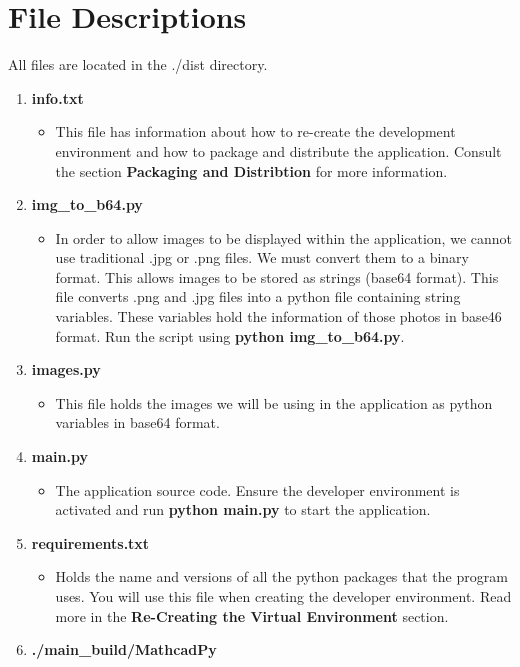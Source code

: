 \documentclass[11pt]{article}
\begin{document}
\section{File Descriptions}
\label{sec:org3997b83}
All files are located in the ./dist directory. 
\begin{enumerate}
\item \textbf{info.txt}
\begin{itemize}
\item This file has information about how to re-create the development environment and how to package and distribute the application. Consult the section \textbf{Packaging and Distribtion} for more information.
\end{itemize}
\item \textbf{img\_to\_b64.py}
\begin{itemize}
\item In order to allow images to be displayed within the application, we cannot use traditional .jpg or .png files. We must convert them to a binary format. This allows images to be stored as strings (base64 format). This file converts .png and .jpg files into a python file containing string variables. These variables hold the information of those photos in base46 format. Run the script using \textbf{python img\_to\_b64.py}.
\end{itemize}
\item \textbf{images.py}
\begin{itemize}
\item This file holds the images we will be using in the application as python variables in base64 format.
\end{itemize}
\item \textbf{main.py}
\begin{itemize}
\item The application source code. Ensure the developer environment is activated and run \textbf{python main.py} to start the application.
\end{itemize}
\item \textbf{requirements.txt}
\begin{itemize}
\item Holds the name and versions of all the python packages that the program uses. You will use this file when creating the developer environment. Read more in the \textbf{Re-Creating the Virtual Environment} section.
\end{itemize}
\item \textbf{./main\_build/MathcadPy}
\begin{itemize}

\end{itemize}
\end{enumerate}
\end{document}
